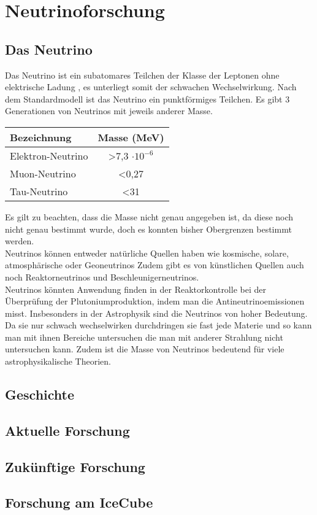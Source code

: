 \chapter{Neutrinoforschung} 
    \vspace{8pt}
    \section{Das Neutrino}

    Das Neutrino ist ein subatomares Teilchen der Klasse der Leptonen ohne elektrische Ladung
        , es unterliegt somit der schwachen Wechselwirkung. 
    Nach dem Standardmodell ist das Neutrino ein punktförmiges Teilchen. Es gibt 3 Generationen von Neutrinos 
        mit jeweils anderer Masse. \\ \cite{Stoecker2000} 
    \begin{center}
        \begin{tabular}{ | l | c | } \hline
            Bezeichnung & Masse (MeV) \\ \hline
            Elektron-Neutrino & >7,3 $\cdot 10^{-6}$\\ 
            Muon-Neutrino & <0,27  \\ 
            Tau-Neutrino & <31 \\ \hline
        \end{tabular}             
    \end{center}
    Es gilt zu beachten, dass die Masse nicht genau angegeben ist, 
        da diese noch nicht genau bestimmt wurde, 
        doch es konnten bisher Obergrenzen bestimmt werden. \\
    Neutrinos können entweder natürliche Quellen haben wie kosmische, solare, atmosphärische oder Geoneutrinos
    Zudem gibt es von künstlichen Quellen auch noch Reaktorneutrinos und Beschleunigerneutrinos. \\
    Neutrinos könnten Anwendung finden in der Reaktorkontrolle bei der Überprüfung der Plutoniumproduktion, 
        indem man die Antineutrinoemissionen misst. \cite{Krauter2006}
    Insbesonders in der Astrophysik sind die Neutrinos von hoher Bedeutung. 
    Da sie nur schwach wechselwirken durchdringen sie fast jede Materie und so kann man mit ihnen Bereiche untersuchen die man mit anderer Strahlung nicht untersuchen kann.
    Zudem ist die Masse von Neutrinos bedeutend für viele astrophysikalische Theorien. \cite{Gelmini2010}
    \section{Geschichte} 
    
    \section{Aktuelle Forschung}
    \section{Zukünftige Forschung}
    \section{Forschung am IceCube}
